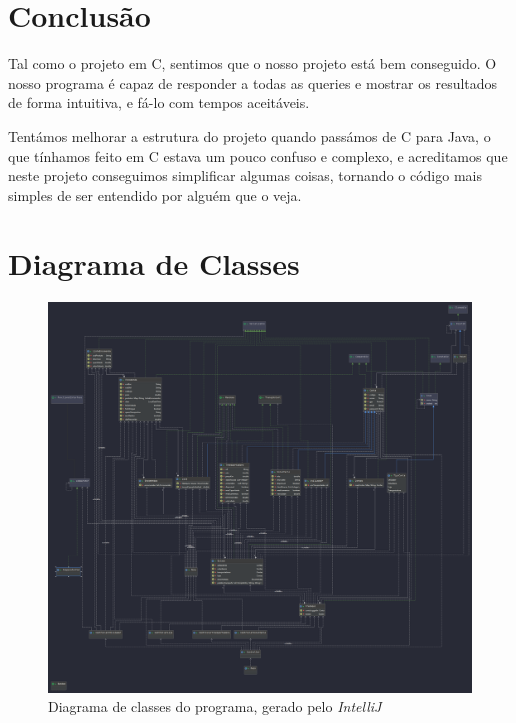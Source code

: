 \documentclass[a4paper]{report}
\begin{document}
	\chapter{Conclusão}

	Tal como o projeto em C, sentimos que o nosso projeto está bem conseguido. O nosso programa é capaz de responder a todas as queries e mostrar os resultados de forma intuitiva, e fá-lo com tempos aceitáveis.
	
	Tentámos melhorar a estrutura do projeto quando passámos de C para Java, o que tínhamos feito em C estava um pouco confuso e complexo, e acreditamos que neste projeto conseguimos simplificar algumas coisas, tornando o código mais simples de ser entendido por alguém que o veja.
	
	\appendix
	
	\chapter{Diagrama de Classes}
	\begin{figure}[H]
		\begin{center}
			\includegraphics[height=0.6\textheight]{DiagramaDeClasses.png}
			\caption{Diagrama de classes do programa, gerado pelo \emph{IntelliJ}}
		\end{center}
	\end{figure}
\end{document}
